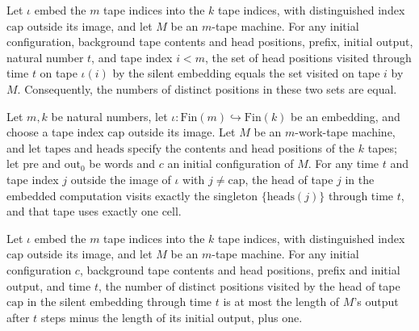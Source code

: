 \begin{theorem}
\label{Turing.embedSilentTM_visitedByTapeHead}
\leanok
{}
Let $\iota$ embed the $m$ tape indices into the $k$ tape indices, with distinguished
index $\mathrm{cap}$ outside its image, and let $M$ be an $m$-tape machine. For any
initial configuration, background tape contents and head positions, prefix, initial
output, natural number $t$, and tape index $i<m$, the set of head positions visited
through time $t$ on tape $\iota(i)$ by the silent embedding equals the set visited on
tape $i$ by $M$. Consequently, the numbers of distinct positions in these two sets are
equal.
\end{theorem}

\begin{theorem}
\label{Turing.embedSilentTM_visitedByTapeHead_frame}
\leanok
{}
Let $m,k$ be natural numbers, let $\iota:\mathrm{Fin}(m)\hookrightarrow\mathrm{Fin}(k)$
be an embedding, and choose a tape index $\mathrm{cap}$ outside its image. Let $M$ be an
$m$-work-tape machine, and let $\mathrm{tapes}$ and $\mathrm{heads}$ specify the
contents and head positions of the $k$ tapes; let $\mathrm{pre}$ and $\mathrm{out}_0$ be
words and $c$ an initial configuration of $M$. For any time $t$ and tape index $j$
outside the image of $\iota$ with $j\ne\mathrm{cap}$, the head of tape $j$ in the
embedded computation visits exactly the singleton $\{\mathrm{heads}(j)\}$ through time
$t$, and that tape uses exactly one cell.
\end{theorem}

\begin{theorem}
\label{Turing.embedSilentTM_spaceUsedByTape_cap}
\leanok
{}
Let $\iota$ embed the $m$ tape indices into the $k$ tape indices, with distinguished
index $\mathrm{cap}$ outside its image, and let $M$ be an $m$-tape machine. For any
initial configuration $c$, background tape contents and head positions, prefix and
initial output, and time $t$, the number of distinct positions visited by the head of
tape $\mathrm{cap}$ in the silent embedding through time $t$ is at most the length of
$M$'s output after $t$ steps minus the length of its initial output, plus one.
\end{theorem}

